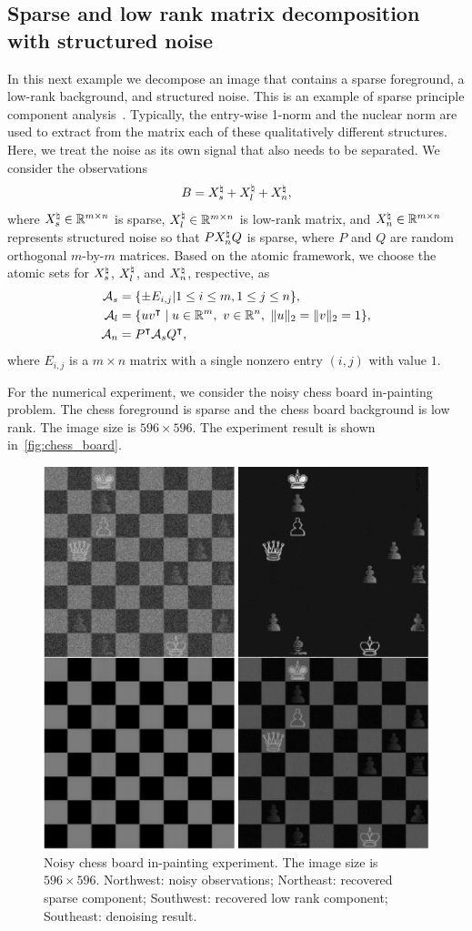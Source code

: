 \subsection{Sparse and low rank matrix decomposition with structured noise}\label{sec:6.3}

In this next example we decompose an image that contains a sparse foreground, a low-rank background, and structured noise. This is an example of sparse principle component analysis~\cite{fazel1998approximations,fhb01,pati1994phase,valiant1977graph}. Typically, the entry-wise 1-norm and the nuclear norm are used to extract from the matrix each of these qualitatively different structures. Here, we treat the noise as its own signal that also needs to be separated. We consider the observations
\[B = X^{\natural}_s + X^{\natural}_l + X^{\natural}_n,\]
where $X^{\natural}_s\in\mathbb{R}^{m\times n}$ is sparse, $X^{\natural}_l\in\mathbb{R}^{m\times n}$ is low-rank matrix, and $X^{\natural}_n\in\mathbb{R}^{m\times n}$ represents structured noise so that $PX^{\natural}_nQ$ is sparse, where $P$ and $Q$ are random orthogonal $m$-by-$m$ matrices. Based on the atomic framework, we choose the atomic sets for $X^{\natural}_s$, $X^{\natural}_l$, and $X^{\natural}_n$, respective, as
\begin{align*}
    \Ascr_s &= \{\pm E_{i,j} | 1 \leq i \leq m, 1 \leq j \leq n \},
  \\\Ascr_l &= \{uv^\intercal \mid u \in \Re^m,\ v \in \Re^n,\ \|u\|_2=\|v\|_2 = 1\},
  \\\Ascr_n &= P^\intercal\Ascr_s Q^\intercal,
\end{align*}
where $E_{i,j}$ is a $m\times n$ matrix with a single nonzero entry $(i,j)$ with value $1$. 

For the numerical experiment, we consider the noisy chess board in-painting problem. The chess foreground is sparse and the chess board background is low rank. The image size is $596\times596$. The experiment result is shown in~\autoref{fig:chess_board}. 

\begin{figure}[t]
    \centering
    \includegraphics[width=.6\textwidth]{./figures/ChessBoard.pdf}
    \caption{Noisy chess board in-painting experiment. The image size is $596\times596$. Northwest: noisy observations; Northeast: recovered sparse component; Southwest: recovered low rank component; Southeast: denoising result.}
    \label{fig:chess_board}
\end{figure}

